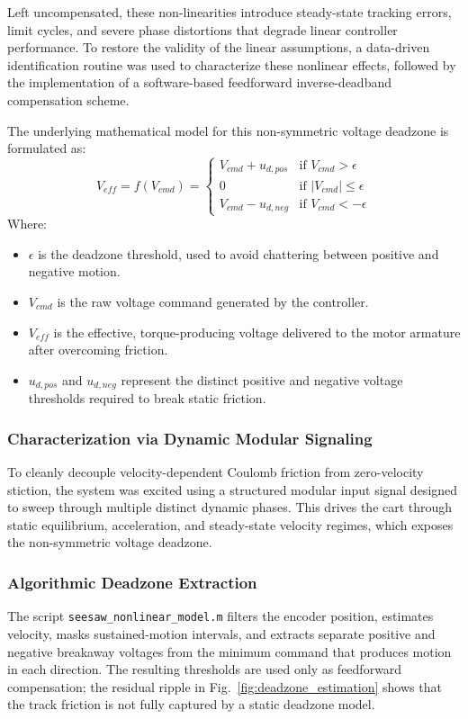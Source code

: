 \documentclass[11pt,a4paper]{article}
\begin{document}
Left uncompensated, these non-linearities introduce steady-state tracking errors, limit cycles, and severe phase distortions that degrade linear controller performance. To restore the validity of the linear assumptions, a data-driven identification routine was used to characterize these nonlinear effects, followed by the implementation of a software-based feedforward inverse-deadband compensation scheme.

The underlying mathematical model for this non-symmetric voltage deadzone is formulated as:
\begin{equation}
V_{eff} = f(V_{cmd}) = 
\begin{cases} 
V_{cmd} + u_{d,pos} & \text{if } V_{cmd} > \epsilon \\ 
0 & \text{if } |V_{cmd}| \le \epsilon \\ 
V_{cmd} - u_{d,neg} & \text{if } V_{cmd} < -\epsilon 
\end{cases}
\label{eq:deadzone_model}
\end{equation}
Where:
\begin{itemize}
    \item $\epsilon$ is the deadzone threshold, used to avoid chattering between positive and negative motion.
    \item $V_{cmd}$ is the raw voltage command generated by the controller.
    \item $V_{eff}$ is the effective, torque-producing voltage delivered to the motor armature after overcoming friction.
    \item $u_{d,pos}$ and $u_{d,neg}$ represent the distinct positive and negative voltage thresholds required to break static friction.
\end{itemize}

\subsubsection{Characterization via Dynamic Modular Signaling}\label{subsub:deadzone_signal}
To cleanly decouple velocity-dependent Coulomb friction from zero-velocity stiction, the system was excited using a structured modular input signal designed to sweep through multiple distinct dynamic phases. This drives the cart through static equilibrium, acceleration, and steady-state velocity regimes, which exposes the non-symmetric voltage deadzone.

\subsubsection{Algorithmic Deadzone Extraction}\label{subsub:deadzone_extraction}
The script \texttt{seesaw\_nonlinear\_model.m} filters the encoder position, estimates velocity, masks sustained-motion intervals, and extracts separate positive and negative breakaway voltages from the minimum command that produces motion in each direction. The resulting thresholds are used only as feedforward compensation; the residual ripple in Fig.~\ref{fig:deadzone_estimation} shows that the track friction is not fully captured by a static deadzone model.
\end{document}
